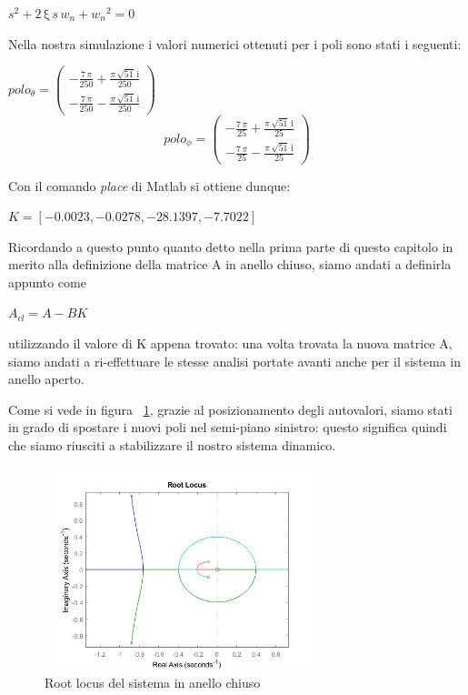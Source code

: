 \begin{center}
	$s^2 +2\,\mathrm{\xi}\,s\,{{w_n}} +{{{w_n}}}^2 =0$
\end{center}

Nella nostra simulazione i valori numerici ottenuti per i poli sono stati i seguenti:
\begin{center}
	$
	polo_{\theta} = \left(\begin{array}{c}
	-\frac{7\,\pi }{250}+\frac{\pi \,\sqrt{51}\,\mathrm{i}}{250}\\
	-\frac{7\,\pi }{250}-\frac{\pi \,\sqrt{51}\,\mathrm{i}}{250}
	\end{array}\right)
	$
	$$
	polo_{\phi} = \left(\begin{array}{c}
	-\frac{7\,\pi }{25}+\frac{\pi \,\sqrt{51}\,\mathrm{i}}{25}\\
	-\frac{7\,\pi }{25}-\frac{\pi \,\sqrt{51}\,\mathrm{i}}{25}
	\end{array}\right)
	$$
\end{center}	

Con il comando \textit{place} di Matlab si ottiene dunque:
\begin{center}
	
	$	K =[  -0.0023  , -0.0278, -28.1397  , -7.7022]$
	
\end{center}

Ricordando a questo punto quanto detto nella prima parte di questo capitolo in merito alla definizione della matrice A in anello chiuso, siamo andati a definirla appunto come

\begin{center}
	$
	A_{cl} =A-BK
	$
\end{center}

utilizzando il valore di K appena trovato: una volta trovata la nuova matrice A, siamo andati a ri-effettuare le stesse analisi portate avanti anche per il sistema in anello aperto.

Come si vede in figura ~\ref{fig:closed_loop_root}, grazie al posizionamento degli autovalori, siamo stati in grado di spostare i nuovi poli nel semi-piano sinistro: questo significa quindi che siamo riusciti a stabilizzare il nostro sistema dinamico.
\begin{figure}[H]
	\centering   	
	\includegraphics[width=0.7\textwidth]{Immagini/root_locus_closed_loop.png}
	\caption{Root locus del sistema in anello chiuso}
	\label{fig:closed_loop_root}
\end{figure}

